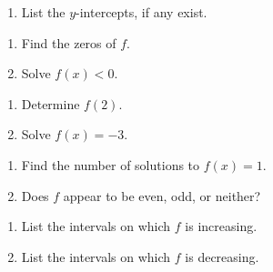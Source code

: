 \begin{ex}
\begin{multicols}{2}
\begin{enumerate}
\item  List the $y$-intercepts, if any exist.

\setcounter{HW}{\value{enumi}}
\end{enumerate}
\end{multicols}

\begin{multicols}{2}
\begin{enumerate}
\setcounter{enumi}{\value{HW}}

\item  Find the zeros of $f$.

\item  Solve $f(x) < 0$.

\setcounter{HW}{\value{enumi}}
\end{enumerate}
\end{multicols}

\begin{multicols}{2}
\begin{enumerate}
\setcounter{enumi}{\value{HW}}

\item  Determine $f(2)$.

\item  Solve $f(x) = -3$.  

\setcounter{HW}{\value{enumi}}
\end{enumerate}
\end{multicols}


\begin{multicols}{2}
\begin{enumerate}
\setcounter{enumi}{\value{HW}}

\item  Find the number of solutions to $f(x) = 1$.

\item  Does $f$ appear to be even, odd, or neither?

\end{enumerate}

\end{multicols}



\begin{multicols}{2}
\begin{enumerate}
\setcounter{enumi}{\value{HW}}

\item  List the intervals on which $f$ is increasing.

\item  List the intervals on which $f$ is decreasing.


\end{enumerate}
\end{multicols}
\end{ex}
